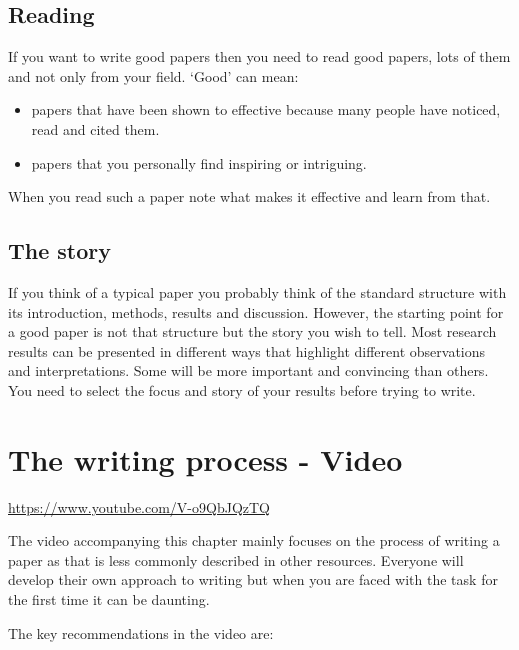 \documentclass[
]{book}
\providecommand{\tightlist}{%
  \setlength{\itemsep}{0pt}\setlength{\parskip}{0pt}}
\begin{document}
\hypertarget{reading}{%
\subsection{Reading}\label{reading}}

If you want to write good papers then you need to read good papers, lots of them and not only from your field. `Good' can mean:

\begin{itemize}
\tightlist
\item
  papers that have been shown to effective because many people have noticed, read and cited them.
\item
  papers that you personally find inspiring or intriguing.
\end{itemize}

When you read such a paper note what makes it effective and learn from that.

\hypertarget{the-story}{%
\subsection{The story}\label{the-story}}

If you think of a typical paper you probably think of the standard structure with its introduction, methods, results and discussion. However, the starting point for a good paper is not that structure but the story you wish to tell. Most research results can be presented in different ways that highlight different observations and interpretations. Some will be more important and convincing than others. You need to select the focus and story of your results before trying to write.

\hypertarget{the-writing-process---video}{%
\section{The writing process - Video}\label{the-writing-process---video}}

\label{fig:unnamed-chunk-27}\url{https://www.youtube.com/V-o9QbJQzTQ}

The video accompanying this chapter mainly focuses on the process of writing a paper as that is less commonly described in other resources. Everyone will develop their own approach to writing but when you are faced with the task for the first time it can be daunting.

The key recommendations in the video are:
\end{document}
